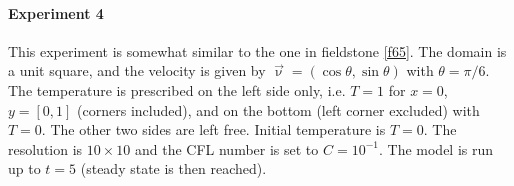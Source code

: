 \paragraph{Experiment 4}

This experiment is somewhat similar to the one in fieldstone \ref{f65}.
The domain is a unit square, and the velocity is given by $\vec\upnu=(\cos \theta, \sin\theta)$ with $\theta=\pi/6$.
The temperature is prescribed on the left side only, i.e. $T=1$ for $x=0$, $y=[0,1]$ (corners included), and 
on the bottom (left corner excluded) with $T=0$. The other two sides are left free. Initial temperature is $T=0$.
The resolution is $10\times10$ and the CFL number is set to $C=10^{-1}$. The model is run up to $t=5$ (steady 
state is then reached). 

